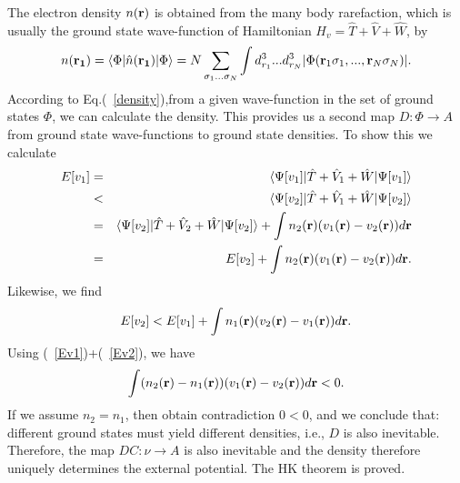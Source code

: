 The electron density $n({\bf r})$ is obtained from the many body rarefaction, which is usually the ground state wave-function of Hamiltonian $H_v={\hat T}+\hat V+ \hat W$, by
\begin{equation}
 n({\bf r_1})=\langle\Phi |\hat n({\bf r_1})|\Phi\rangle = N\sum_{\sigma_1...\sigma_N}\int d^3_{r_1}...d^3_{r_N}|\Phi({\bf r}_1\sigma_1,...,{\bf r}_N\sigma_N)|.
\label{density}
\end{equation}
According to Eq.(~\ref{density}),from a given wave-function in the set of ground states $\Phi$,  we can calculate the density.
This provides us a second map $D:\Phi \rightarrow A$ from ground state wave-functions to ground state densities. To show this we calculate 
\begin{eqnarray}
E[v_1] &=& \langle\Psi[v_1]|\hat T + \hat V_1 +\hat W|\Psi[v_1]\rangle \nonumber\\  
           &<& \langle\Psi[v_2]|\hat T + \hat V_1 +\hat W|\Psi[v_2]\rangle \nonumber \\
           &=&  \langle\Psi[v_2]|\hat T + \hat V_2 +\hat W|\Psi[v_2]\rangle +\int n_2({\bf r})(v_1({\bf r})-v_2({\bf r}))d{\bf r} \nonumber\\
           &=&  E[v_2] +\int n_2({\bf r})(v_1({\bf r})-v_2({\bf r}))d{\bf r} \label{Ev1}.
\end{eqnarray}
Likewise, we find
\begin{equation}
E[v_2]<  E[v_1] +\int n_1({\bf r})(v_2({\bf r})-v_1({\bf r}))d{\bf r} \label{Ev2}.
\end{equation}
 Using (~\ref{Ev1})+(~\ref{Ev2}), we have
 \begin{equation}
  \int (n_2({\bf r})-n_1({\bf r}))(v_1({\bf r})-v_2({\bf r}))d{\bf r} < 0.
 \end{equation}
If we assume $n_2=n_1$, then obtain contradiction $0<0$, and we conclude that: different ground states must yield
different densities, i.e., $D$ is also inevitable. Therefore, the map $DC: \nu \rightarrow A$ is also inevitable and the density therefore uniquely determines the external potential. The HK theorem is proved.


